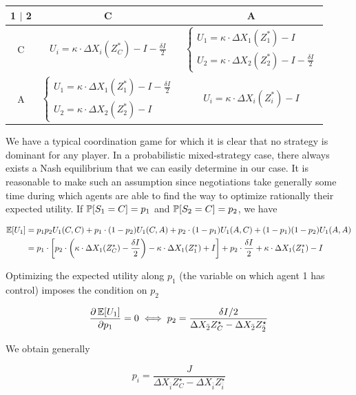 \begin{itemize}
\medskip
\hfill
\begin{tabular}{ |c|c|c| } 

 \hline
 1 $|$ 2  & C & A \\ \hline
 C & $U_i = \kappa \cdot \Delta X_i(Z^{\ast}_C) - I - \frac{\delta I}{2}$
   & $\begin{cases}U_1 = \kappa \cdot \Delta X_1(Z^{\ast}_1)-I \\U_2 = \kappa \cdot \Delta X_2(Z^{\ast}_2)-I - \frac{\delta I}{2}\end{cases}$ \\ \hline
 A & $\begin{cases}U_1 = \kappa \cdot \Delta X_1(Z^{\ast}_1)-I - \frac{\delta I}{2}\\U_2 = \kappa \cdot \Delta X_2(Z^{\ast}_2)-I\end{cases}$
   & $U_i = \kappa \cdot \Delta X_i(Z^{\ast}_i) - I$ \\
 \hline
\end{tabular}
\hfill\hfill
\medskip

We have a typical coordination game for which it is clear that no strategy is dominant for any player. In a probabilistic mixed-strategy case, there always exists a Nash equilibrium that we can easily determine in our case. It is reasonable to make such an assumption since negotiations take generally some time during which agents are able to find the way to optimize rationally their expected utility. If $\operatorname{\mathbb{P}}\!\left[S_1=C\right] = p_1$ and $\operatorname{\mathbb{P}}\!\left[S_2=C\right] = p_2$, we have

\[
\begin{split}
\operatorname{\mathbb{E}}\!\left[U_1\right] & =p_1 p_2 U_1(C,C) + p_1\cdot (1-p_2) U_1(C,A) + p_2 \cdot (1-p_1) U_1(A,C) + (1-p_1)(1-p_2) U_1(A,A)\\
& = p_1 \cdot \left[ p_2 \cdot \left(\kappa \cdot \Delta X_1(Z^{\ast}_C) - \frac{\delta I}{2} \right) - \kappa \cdot \Delta X_1(Z^{\ast}_1) + I\right] + p_2\cdot\frac{\delta I}{2} + \kappa\cdot\Delta X_1(Z^{\ast}_1)-I
\end{split}
\]

Optimizing the expected utility along $p_1$ (the variable on which agent 1 has control) imposes the condition on $p_2$

\[
\frac{\partial \operatorname{\mathbb{E}}\!\left[U_1\right]}{\partial p_1} = 0 \iff p_2 = \frac{\delta I / 2}{\Delta X_{\bar{2}}{Z^{\star}_{C}} - \Delta X_{\bar{2}}{Z^{\star}_{\bar{2}}}}
\]

We obtain generally

\[
p_i = \frac{J}{\Delta X_{\bar{i}}{Z^{\star}_{C}} - \Delta X_{\bar{i}}{Z^{\star}_{\bar{i}}}}
\]


\end{itemize}
